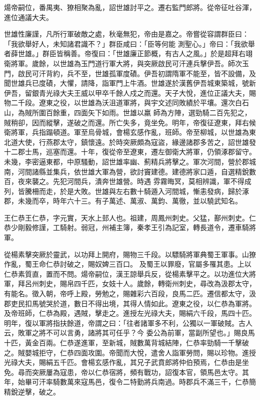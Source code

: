 \begin{pinyinscope}
 煬帝嗣位，番禺夷、獠相聚為亂，詔世雄討平之。遷右監門郎將。從帝征吐谷渾，進位通議大夫。



 世雄性廉謹，凡所行軍破敵之處，秋毫無犯，帝由是嘉之。帝嘗從容謂群臣曰：「我欲舉好人，未知諸君識不？」群臣咸曰：「臣等何能
 測聖心。」帝曰：「我欲舉者薛世雄。」群臣皆稱善。帝復曰：「世雄廉正節概，有古人之風。」於是超拜右翊衛將軍。歲餘，以世雄為玉門道行軍大將，與突厥啟民可汗連兵擊伊吾。師次玉門，啟民可汗背約，兵不至，世雄孤軍度磧。伊吾初謂隋軍不能至，皆不設備，及聞世雄兵已度磧，大懼，請降，詣軍門上牛酒。世雄遂於漢舊伊吾城東築城，號新伊吾，留銀青光祿大夫王威以甲卒千餘人戍之而還。天子大悅，進位正議大夫，賜物二千段。遼東之役，以世雄為沃沮道軍將，與宇文述同敗績於平壤。還次白石山，為賊所圍百餘重，四面矢下如雨。世雄以羸
 師為方陣，選勁騎二百先犯之，賊稍卻，因而縱擊，遂破之而還。所亡失多，竟坐免。明年，帝復征遼東，拜右候衛將軍，兵指蹋頓道。軍至烏骨城，會楊玄感作亂，班師。帝至柳城，以世雄為東北道大使，行燕郡太守，鎮懷遠。於時突厥頗為寇盜，緣邊諸郡多苦之，詔世雄發十二郡士馬，巡塞而還。十年，復從帝至遼東，遷左御衛大將軍，仍領涿郡留守。未幾，李密逼東都，中原騷動，詔世雄率幽、薊精兵將擊之。軍次河間，營於郡城南，河間諸縣並集兵，依世雄大軍為營，欲討竇建德。建德將家口遁，自選精銳數百，夜來襲之。先犯河間兵，潰奔世雄營。時遇
 雰霧晦冥，莫相辨識，軍不得成列，皆騰柵而走，於是大敗。世雄與左右數十騎遁入河間城，慚恚發病，歸於涿郡，未幾而卒，時年六十三。有子萬述、萬淑、萬鈞、萬徹，並以驍武知名。



 王仁恭王仁恭，字元實，天水上邽人也。祖建，周鳳州刺史。父猛，鄯州刺史。仁恭少剛毅修謹，工騎射。弱冠，州補主簿，秦孝王引為記室，轉長道令，遷車騎將軍。



 從楊素擊突厥於靈武，以功拜上開府，賜物三千段。以驃騎將軍典蜀王軍事。山獠作亂，蜀王命仁恭討破之，賜奴婢三百口。
 及蜀王以罪廢，官屬多罹其患。上以仁恭素質直，置而不問。煬帝嗣位，漢王諒舉兵反，從楊素擊平之。以功進位大將軍，拜呂州刺史，賜帛四千匹，女妓十人。歲餘，轉衛州刺史，尋改為汲郡太守，有能名。徵入朝，帝呼上殿，勞勉之，賜雜彩六百段，良馬二匹。遷信都太守，汲郡吏民扣馬號哭於道，數日不得出境，其得人情如此。遼東之役，以仁恭為軍將。及帝班師，仁恭為殿，遇賊，擊走之。進授左光祿大夫，賜絹六千段，馬四十匹。明年，復以軍將指扶餘道，帝謂之曰：「往者諸軍多不利，公獨以一軍破賊。古人云，敗軍之將不可以言勇，諸將其可任乎？今
 委公為前軍，當副所望也。」賜良馬十匹，黃金百兩。仁恭遂進軍，至新城，賊數萬背城結陣，仁恭率勁騎一千擊破之。賊嬰城拒守，仁恭四面攻圍。帝聞而大悅，遣舍人詣軍勞問，賜以珍物。進授光祿大夫，賜絹五千匹。會楊玄感作亂，其兄子武賁郎將仲伯預焉，仁恭由是坐免。尋而突厥屢為寇患，帝以仁恭宿將，頻有戰功，詔復本官，領馬邑太守。其年，始畢可汗率騎數萬來寇馬邑，復令二特勤將兵南過。時郡兵不滿三千，仁恭簡精銳逆擊，破之。




\end{pinyinscope}
